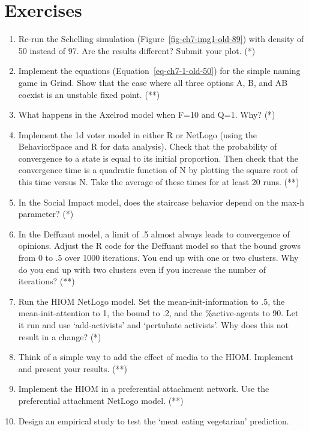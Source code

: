 \documentclass[
  letterpaper,
]{scrbook}
\begin{document}
\hypertarget{exercises-6}{%
\section{Exercises}\label{exercises-6}}

\begin{enumerate}
\def\labelenumi{\arabic{enumi})}
\item
  Re-run the Schelling simulation (Figure~\ref{fig-ch7-img1-old-89})
  with density of 50 instead of 97. Are the results different? Submit
  your plot. (*)
\item
  Implement the equations (Equation~\ref{eq-ch7-1-old-50}) for the
  simple naming game in Grind. Show that the case where all three
  options A, B, and AB coexist is an unstable fixed point. (**)
\item
  What happens in the Axelrod model when F=10 and Q=1. Why? (*)
\item
  Implement the 1d voter model in either R or NetLogo (using the
  BehaviorSpace and R for data analysis). Check that the probability of
  convergence to a state is equal to its initial proportion. Then check
  that the convergence time is a quadratic function of N by plotting the
  square root of this time versus N. Take the average of these times for
  at least 20 runs. (**)
\item
  In the Social Impact model, does the staircase behavior depend on the
  max-h parameter? (*)
\item
  In the Deffuant model, a limit of .5 almost always leads to
  convergence of opinions. Adjust the R code for the Deffuant model so
  that the bound grows from 0 to .5 over 1000 iterations. You end up
  with one or two clusters. Why do you end up with two clusters even if
  you increase the number of iterations? (**)
\item
  Run the HIOM NetLogo model. Set the mean-init-information to .5, the
  mean-init-attention to 1, the bound to .2, and the \%active-agents to
  90. Let it run and use `add-activists' and `pertubate activists'. Why
  does this not result in a change? (*)
\item
  Think of a simple way to add the effect of media to the HIOM.
  Implement and present your results. (**)
\item
  Implement the HIOM in a preferential attachment network. Use the
  preferential attachment NetLogo model. (**)
\item
  Design an empirical study to test the `meat eating vegetarian'
  prediction.
\end{enumerate}
\end{document}
